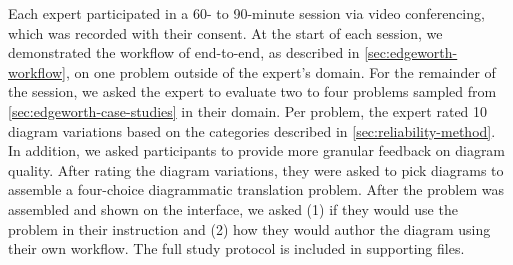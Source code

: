 Each expert participated in a 60- to 90-minute session via video conferencing, which was recorded with their consent. At the start of each session, we demonstrated the workflow of \Edgeworth end-to-end, as described in \cref{sec:edgeworth-workflow}, on one problem outside of the expert's domain. For the remainder of the session, we asked the expert to evaluate two to four problems sampled from \cref{sec:edgeworth-case-studies} in their domain. Per problem, the expert rated 10 diagram variations based on the categories described in \cref{sec:reliability-method}. In addition, we asked participants to provide more granular feedback on diagram quality. After rating the diagram variations, they were asked to pick diagrams to assemble a four-choice diagrammatic translation problem. After the problem was assembled and shown on the interface, we asked (1) if they would use the problem in their instruction and (2) how they would author the diagram using their own workflow. The full study protocol is included in supporting files.





